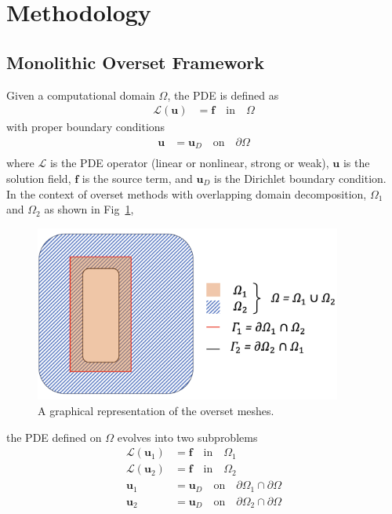 \documentclass[preprint,12pt,sort&compress]{elsarticle}
\theoremstyle{definition}%
\begin{document}
\section{Methodology}\label{sec:methodology}
\subsection{Monolithic Overset Framework}\label{sec:monolithic-overset-framework}
Given a computational domain $\Omega$, the PDE is defined as
\begin{align}
  \mathcal{L}(\bm{u}) &= \bm{f} \quad \text{in} \quad \Omega
\end{align}
with proper boundary conditions
\begin{align}
  \bm{u} &= \bm{u}_D \quad \text{on} \quad \partial \Omega \\
\end{align}
where $\mathcal{L}$ is the PDE operator (linear or nonlinear, strong or weak), $\bm{u}$ is the solution field, $\bm{f}$ is the source term, and $\bm{u}_D$ is the Dirichlet boundary condition.\\
In the context of overset methods with overlapping domain decomposition, $\Omega_1$ and $\Omega_2$ as shown in Fig~\ref{fig:overset-diagram},
\begin{figure}[htb]
  \centering
  \includegraphics[angle=0,width=0.9\textwidth]{fig/overset-diagram.png}
  \caption{A graphical representation of the overset meshes.}
  \label{fig:overset-diagram}
\end{figure}
the PDE defined on $\Omega$ evolves into two subproblems
\begin{align}
  \mathcal{L}(\bm{u}_1) &= \bm{f} \quad \text{in} \quad \Omega_1 \\
  \mathcal{L}(\bm{u}_2) &= \bm{f} \quad \text{in} \quad \Omega_2\\
  \bm{u}_1 &= \bm{u}_D \quad \text{on} \quad \partial \Omega_1 \cap \partial \Omega\label{eq:gov-dirichlet-bc1} \\
  \bm{u}_2 &= \bm{u}_D \quad \text{on} \quad \partial \Omega_2 \cap \partial \Omega\label{eq:gov-dirichlet-bc2}
\end{align}
\end{document}
